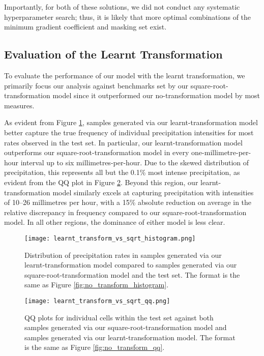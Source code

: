 \documentclass[ oneside,%
                    author={George Herbert},
                    degree={MSci},
                     title={Diffusion Models for Time-Evolving Precipitation Fields},
                  subtitle={}]{dissertation}
\begin{document}
Importantly, for both of these solutions, we did not conduct any systematic hyperparameter search; thus, it is likely that more optimal combinations of the minimum gradient coefficient and masking set exist.

\subsection{Evaluation of the Learnt Transformation}

To evaluate the performance of our model with the learnt transformation, we primarily focus our analysis against benchmarks set by our square-root-transformation model since it outperformed our no-transformation model by most measures.

As evident from Figure \ref{fig:learnt_transform_vs_sqrt_histogram}, samples generated via our learnt-transformation model better capture the true frequency of individual precipitation intensities for most rates observed in the test set. In particular, our learnt-transformation model outperforms our square-root-transformation model in every one-millimetre-per-hour interval up to six millimetres-per-hour. Due to the skewed distribution of precipitation, this represents all but the 0.1\% most intense precipitation, as evident from the QQ plot in Figure \ref{fig:learnt_transform_vs_sqrt_qq}. Beyond this region, our learnt-transformation model similarly excels at capturing precipitation with intensities of 10--26 millimetres per hour, with a 15\% absolute reduction on average in the relative discrepancy in frequency compared to our square-root-transformation model. In all other regions, the dominance of either model is less clear.

\begin{figure}[htbp]
      \centering
      \texttt{[image: learnt\_transform\_vs\_sqrt\_histogram.png]}
      \caption{Distribution of precipitation rates in samples generated via our learnt-transformation model compared to samples generated via our square-root-transformation model and the test set. The format is the same as Figure \ref{fig:no_transform_histogram}.}
      \label{fig:learnt_transform_vs_sqrt_histogram}
\end{figure}

\begin{figure}[htbp]
      \centering
      \texttt{[image: learnt\_transform\_vs\_sqrt\_qq.png]}
      \caption{QQ plots for individual cells within the test set against both samples generated via our square-root-transformation model and samples generated via our learnt-transformation model. The format is the same as Figure \ref{fig:no_transform_qq}.}
      \label{fig:learnt_transform_vs_sqrt_qq}
\end{figure}
\end{document}
